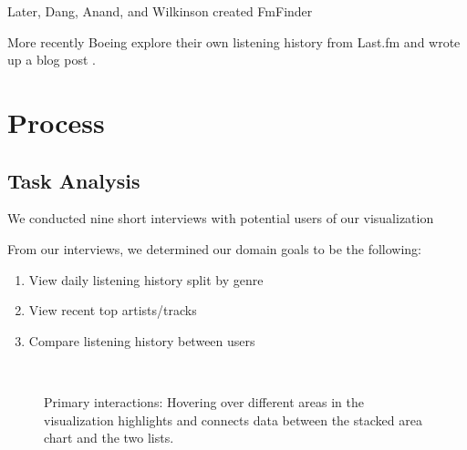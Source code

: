 \documentclass[journal]{vgtc}                %
\begin{document}
Later, Dang, Anand, and Wilkinson created FmFinder \cite{Dan12} 

More recently Boeing explore their own listening history from Last.fm and wrote up a blog post \cite{Boe16}. 

\section{Process}
\subsection{Task Analysis}
We conducted nine short interviews with potential users of our visualization 

From our interviews, we determined our domain goals to be the following:
\begin{enumerate}
  \item View daily listening history split by genre
  \item View recent top artists/tracks
  \item Compare listening history between users
\end{enumerate}


\begin{figure}
\centering
\mbox{
  \quad
  \quad
}
\caption{Primary interactions: Hovering over different areas in the visualization highlights and connects data between the stacked area chart and the two lists.}
\label{fig:interactions}
\end{figure}
\end{document}
